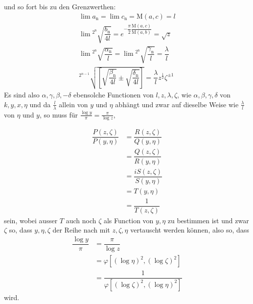 und so fort bis zu den Grenzwerthen:
\[
\begin{gathered}
\lim a_{\mathrm n}=\lim c_{\mathrm n}=\mathrm{M}(a,c)=l\\[7pt]
\lim{}^{2^{\mathrm n}}\!\surd {\dfrac{b_{\mathrm n}}{4l}}=e^{-\dfrac{\pi}{2}\dfrac{\mathrm{M}(a,c)}{\mathrm{M}(a,b)}}=\surd  z\\[7pt]
\lim{}^{2^{\mathrm n}}\!\surd {\dfrac{\alpha_{\mathrm n}}{l}}=\lim{}^{2^{\mathrm n}}\!\surd {\dfrac{\gamma_{\mathrm n}}{l}}=\dfrac{\lambda}{l}\\[7pt]
{}^{2^{n-1}}\!\surd {\left[\surd {\dfrac{\beta_{\mathrm n}}{4l}}\mathbin{\pm}\surd {\dfrac{\delta_{\mathrm n}}{4l}}\right]}=\dfrac{\lambda}{l}z^{\frac12}\zeta^{\pm1}
\end{gathered}
\]
Es sind also $\alpha,\allowbreak \gamma,\allowbreak \beta,\allowbreak -\delta$ ebensolche Functionen von $l,\allowbreak z,\allowbreak \lambda,\allowbreak \zeta$, wie $\alpha,\allowbreak \beta,\allowbreak \gamma,\allowbreak \delta$ von $k,\allowbreak y,\allowbreak x,\allowbreak \eta$ und da $\frac{l}{\lambda}$ allein von $y$ und $\eta$ abhängt und zwar auf dieselbe Weise wie $\frac{\lambda}{l}$ von $\eta$ und $y$, so muss für $\frac{\log y}{\pi}=\frac{\pi}{\log z}$,


\[
\begin{aligned}\dfrac{P(z,\zeta)}{P(y,\eta)}&=\dfrac{R(z,\zeta)}{Q(y,\eta)}\\[7pt]&=\dfrac{Q(z,\zeta)}{R(y,\eta)}\\[7pt]&=\dfrac{iS(z,\zeta)}{S(y,\eta)}\\[7pt]&=T(y,\eta)\\[7pt]&=\dfrac{1}{T(z,\zeta)}\end{aligned}
\]
sein, wobei ausser $T$ auch noch $\zeta$ als Function von $y,\allowbreak \eta$ zu bestimmen ist und zwar $\zeta$ so, dass $y,\allowbreak \eta,\allowbreak \zeta$ der Reihe nach mit $z,\allowbreak \zeta,\allowbreak \eta$ vertauscht werden können, also so, dass
\[
\begin{aligned}\dfrac{\log y}{\pi}&=\dfrac{\pi}{\log z}\\[7pt]&=\varphi[(\log\eta)^2,(\log\zeta)^2]\\[7pt]&=\dfrac{1}{\varphi[(\log\zeta)^2,(\log\eta)^2]}\end{aligned}
\]
wird.

